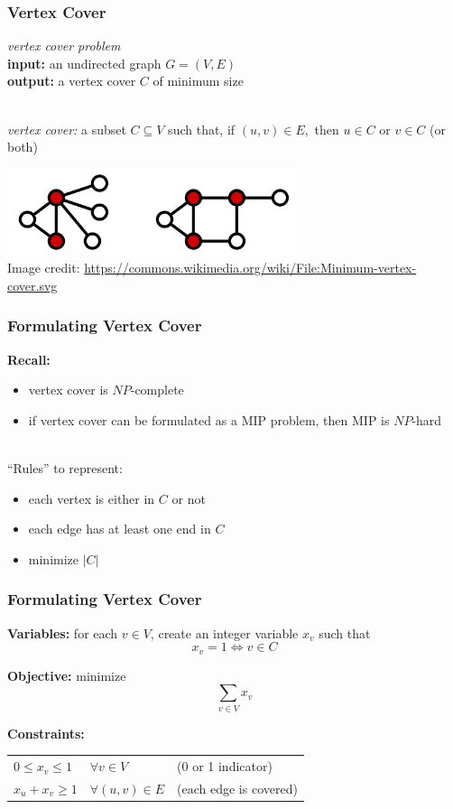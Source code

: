 \documentclass{beamer}
\newcommand{\stanza}{ \\~\ }
\begin{document}
\begin{frame} \frametitle{Vertex Cover}
  \emph{vertex cover problem} \\
  \textbf{input:} an undirected graph $G=(V, E)$ \\
  \textbf{output:} a vertex cover $C$ of minimum size
  \stanza

  \emph{vertex cover:} a subset $C \subseteq V$ such that, if $(u, v) \in E,$ then $u \in C$ or $v \in C$ (or both)
 
  \begin{center}
    \includegraphics[height=1in]{vertex-cover.png} \\
    {\tiny Image credit: \url{https://commons.wikimedia.org/wiki/File:Minimum-vertex-cover.svg} }
  \end{center}

\end{frame}

\begin{frame} \frametitle{Formulating Vertex Cover}
  \textbf{Recall:}
  \begin{itemize}
    \item vertex cover is $NP$-complete
    \item if vertex cover can be formulated as a MIP problem, then MIP is $NP$-hard
    \stanza
  \end{itemize}

  ``Rules'' to represent:
    \begin{itemize}
      \item each vertex is either in $C$ or not
      \item each edge has at least one end in $C$
      \item minimize $|C|$
    \end{itemize}
\end{frame}

\begin{frame} \frametitle{Formulating Vertex Cover}
\textbf{Variables:} for each $v \in V$, create an integer variable $x_v$ such that
\[ x_v = 1 \Leftrightarrow v \in C \]

\textbf{Objective:} minimize
\[ \sum_{v \in V} x_v \]

\textbf{Constraints:}
\begin{tabular}{lll}
  $0 \leq x_v \leq 1$ & $\forall v \in V$ & (0 or 1 indicator) \\
  $x_u + x_v \geq 1$ & $\forall (u, v) \in E$ & (each edge is covered)
\end{tabular}

\end{frame}
\end{document}
